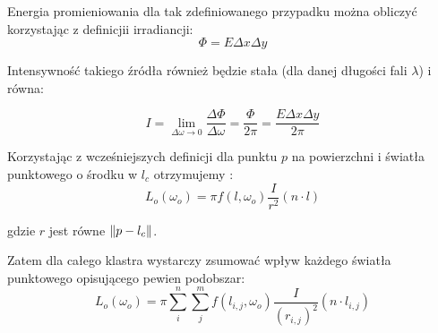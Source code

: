 \documentclass[../main.tex]{subfiles}
\begin{document}
Energia promieniowania dla tak zdefiniowanego przypadku można obliczyć korzystając z definicjii irradiancji:
\[
	\Phi = E \Delta{x} \Delta{y}
\]

Intensywność takiego źródła również będzie stała (dla danej długości fali $\lambda$) i równa: 

\[
  I 
	= \lim_{\Delta\omega \rightarrow 0} {
		\frac{\Delta\Phi}{\Delta\omega}
	} 
	= \frac{\Phi}{2\pi}
	= \frac{E\Delta{x}\Delta{y}}{2\pi}
\]

Korzystając z wcześniejszych definicji dla punktu $p$ na powierzchni i światła punktowego o środku w $l_c$ otrzymujemy \cite{pbr_frostbite}:
\[
	L_o(\omega_o) = \pi f(l, \omega_o) \frac{I}{r^2} (n \cdot l)
\]

\noindent gdzie $r$ jest równe $\norm{p-l_c}$.

Zatem dla całego klastra wystarczy zsumować wpływ każdego światła punktowego opisującego pewien podobszar:
\[
	L_o(\omega_o) = \pi \sum_{i}^{n} \sum_{j}^{m} {
		f(l_{i,j}, \omega_o) \frac{I}{(r_{i,j})^2} (n \cdot l_{i,j})
	}
\]
\end{document}
